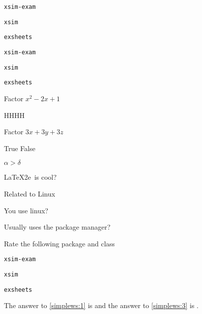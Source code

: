 \documentclass{article}
\begin{document}
        \begin{enumext}[list-offset=1cm,columns=3]
          \item \texttt{xsim-exam}%
          \item \texttt{xsim} %
          \item \texttt{exsheets}%
        \end{enumext}

        \begin{enumext*}[list-offset=1cm,columns=3]
          \item \texttt{xsim-exam}%
          \item \texttt{xsim} %
          \item \texttt{exsheets}%
        \end{enumext*}

\begin{enumext*}[save-ans=simplews,columns=2,check-ans=true,show-ans=true,nosep,save-ref=true,wrap-label={\tikz[scale=0.25]\duck[signpost=\scalebox{0.6}{#1}];}]
  \item Factor $x^{2}-2x+1$
    \begin{anskey*}
    HHHH
    \end{anskey*}
  \item Factor $3x+3y+3z$ 
  \item True False
    \begin{enumext}[nosep]
      \item $\alpha > \delta$ 
      \item \LaTeX2e\ is cool? 
    \end{enumext}
  \item Related to Linux
    \begin{enumext}[nosep]
      \item You use linux? 
      \item Usually uses the package manager? 
      \item Rate the following package and class
        \begin{enumext}[nosep]
          \item \texttt{xsim-exam} 
          \item \texttt{xsim} 
          \item \texttt{exsheets} 
        \end{enumext}
    \end{enumext}
\end{enumext*}

The answer to \ref{simplews:1} is  and the answer
to \ref{simplews:3} is .

\end{document}
